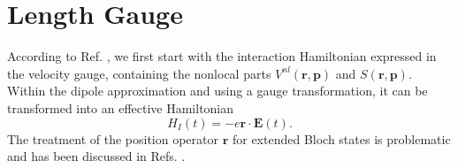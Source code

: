 
\section{Length Gauge}\label{longi}

According to Ref. \cite{ismailPRL01}, we first start with the interaction
Hamiltonian expressed in the velocity gauge, containing the nonlocal parts
$V^{nl}(\mathbf{r},\mathbf{p})$ and $S (\mathbf{r},\mathbf{p})$. Within the
dipole approximation and using a gauge transformation, it can be transformed
into an effective Hamiltonian \cite{valerie}
\begin{equation}
H_{I}(t)=-e\mathbf{r}\cdot \mathbf{E}(t).
\label{rde}
\end{equation}
The treatment of the position operator $\mathbf{r}$ for extended Bloch states is
problematic and has been discussed in Refs. \cite{adamsJCP53, blountSSP62}.

